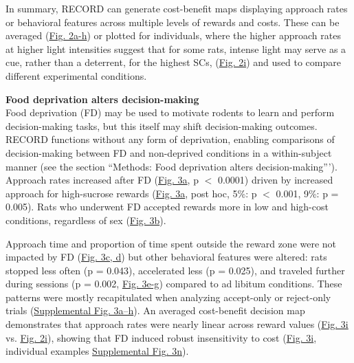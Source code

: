 \documentclass{article}
\begin{document}
\vspace{1em}

In summary, RECORD can generate cost-benefit maps displaying approach rates or behavioral features across multiple levels of rewards and costs. These can be averaged (\hyperref[fig:Record_main_2]{Fig. 2a-h}) or plotted for individuals, where the higher approach rates at higher light intensities suggest that for some rats, intense light may serve as a cue, rather than a deterrent, for the highest SCs, (\hyperref[fig:Record_main_2]{Fig. 2i}) and used to compare different experimental conditions.

\vspace{1em}

\noindent\textbf{Food deprivation alters decision-making}\\
Food deprivation (FD) may be used to motivate rodents to learn and perform decision-making tasks, but this itself may shift decision-making outcomes. RECORD functions without any form of deprivation, enabling comparisons of decision-making between FD and non-deprived conditions in a within-subject manner (see the section “Methods: Food deprivation alters decision-making”’). Approach rates increased after FD (\hyperref[fig:Record_main_3]{Fig. 3a}, p $<$ 0.0001) driven by increased approach for high-sucrose rewards (\hyperref[fig:Record_main_3]{Fig. 3a}, post hoc, 5\%: p $<$ 0.001, 9\%: p = 0.005). Rats who underwent FD accepted rewards more in low and high-cost conditions, regardless of sex (\hyperref[fig:Record_main_3]{Fig. 3b}).

\vspace{1em}

Approach time and proportion of time spent outside the reward zone were not impacted by FD (\hyperref[fig:Record_main_3]{Fig. 3c, d}) but other behavioral features were altered: rats stopped less often (p = 0.043), accelerated less (p = 0.025), and traveled further during sessions (p = 0.002, \hyperref[fig:Record_main_3]{Fig. 3e-g}) compared to ad libitum conditions. These patterns were mostly recapitulated when analyzing accept-only or reject-only trials (\hyperref[fig:Record_SI_3]{Supplemental Fig. 3a–h}). An averaged cost-benefit decision map demonstrates that approach rates were nearly linear across reward values (\hyperref[fig:Record_main_3]{Fig. 3i} vs. \hyperref[fig:Record_main_2]{Fig. 2i}), showing that FD induced robust insensitivity to cost (\hyperref[fig:Record_main_3]{Fig. 3i}, individual examples \hyperref[fig:Record_SI_3]{Supplemental Fig. 3n}).
\end{document}
